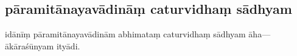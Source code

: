 \documentclass[12pt]{article}
\newcommand{\emdash} {\hspace{0em}—\hspace{0em}}
\begin{document}
% 

\subsection{pāramitānayavādināṃ caturvidhaṃ sādhyam}
idānīṃ pāramitānayavādinām abhimataṃ\footnoteB{
	abhimataṃ] \EDD; abhimata \MS
} caturvidhaṃ sādhyam āha\emdash ākāraśūnyam ityādi.
\end{document}
